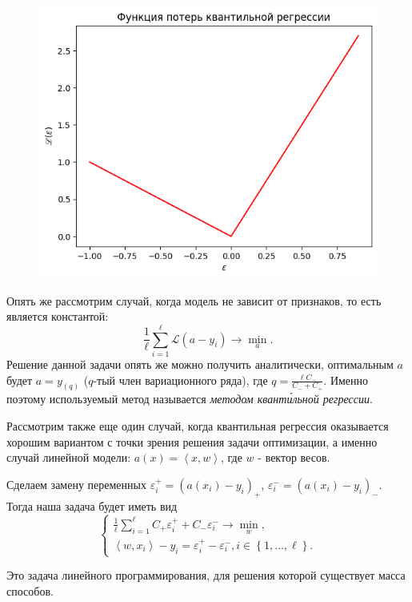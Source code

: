 \begin{figure}[h]
    \centering
    \includegraphics{chapters/nonstandart_error/images/ФПКР.png}
\end{figure}

Опять же рассмотрим случай, когда модель не зависит от признаков, то есть является константой:
$$\frac{1}{\ell}\sum\limits_{i=1}^\ell\mathscr{L}\left(a - y_i\right) \longrightarrow \min\limits_{a}.$$
Решение данной задачи опять же можно получить аналитически, оптимальным $a$ будет $a = y_{(q)}$ ($q$-тый член вариационного ряда), где $q = \frac{\ell C_-}{C_- + C_+}$.
Именно поэтому используемый метод называется \textit{методом квант\'{и}льной регрессии}.

Рассмотрим также еще один случай, когда квантильная регрессия оказывается хорошим вариантом с точки зрения решения задачи оптимизации, а именно случай линейной модели: $a(x) = \left\langle x, w \right\rangle$, где $w$ - вектор весов.

Сделаем замену переменных $\varepsilon_i^+ = (a(x_i) - y_i)_+$, $\varepsilon_i^- = (a(x_i) - y_i)_-$. Тогда наша задача будет иметь вид
$$\begin{cases}
        \frac{1}{\ell}\sum_{i=1}^\ell C_+\varepsilon_i^+ + C_-\varepsilon_i^- \longrightarrow \min\limits_{w}, \\
        \left\langle w, x_i \right\rangle - y_i = \varepsilon_i^+ - \varepsilon_i^-, i \in \left\{ 1 , \dotsc, \ell \right\}.
    \end{cases}$$

Это задача линейного программирования, для решения которой существует масса способов.


